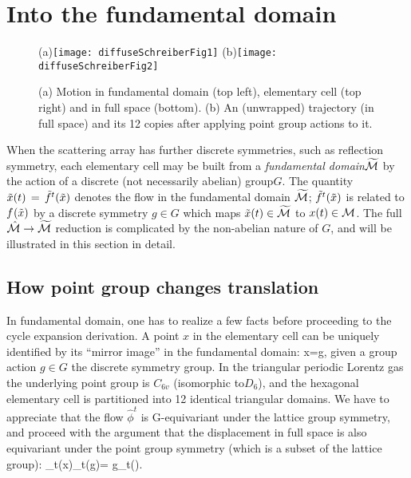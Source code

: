 \documentclass[aps,pre,
                showpacs,
                twocolumn,
                groupedaddress,
                floatfix]{revtex4-1}
\begin{document}
\section{Into the fundamental domain}
\label{s-SymmetryReduction}
\begin{figure}[htbp]
  \begin{center}
    (a)\texttt{[image: diffuseSchreiberFig1]}
    (b)\texttt{[image: diffuseSchreiberFig2]}
  \end{center}
  \caption[]{\label{fig-schrieberFig12} (a) Motion in fundamental domain (top   left), elementary cell (top right) and  in full space (bottom). (b) An (unwrapped) trajectory (in full  space) and its 12 copies after applying point group actions to it.   }
\end{figure}


When the scattering array has further discrete symmetries, such as reflection symmetry, each elementary cell may be built from a {\em fundamental domain}${\widetilde {{\cal M}}}$ by the action of a discrete (not necessarily abelian) group$G$. The quantity $\tilde x(t)\,=\,{\tilde{f}^{t}(\tilde x)}$ denotes the flow in the fundamental domain ${\widetilde {{\cal M}}}$; ${\tilde{f}^{t}(\tilde x)}$ is related to${f^{}(\tilde x)}$ by a discrete symmetry $g \in G$ which maps $\tilde x(t)\in{\widetilde {\ensuremath{{\cal M}}}}$ to ${x}(t) \in {\ensuremath{{\cal M}}}$. The full $\hat {{\cal M}} \rightarrow {\widetilde{\ensuremath{{\cal M}}}}$ reduction is complicated by the non-abelian nature of $G$, and will be illustrated in this section in detail.

\subsection{How point group changes translation}

In fundamental domain, one has to realize a few facts before proceeding to the cycle expansion derivation. A point $x$ in the elementary cell can be uniquely identified by its ``mirror image'' in the fundamental domain:
\beq
x=g\circ\tx,
\eeq
given a group action $g\in G$ the discrete symmetry group. In the triangular periodic Lorentz gas the underlying point group is $C_{6v}$ (isomorphic to$D_6$), and the hexagonal elementary cell is partitioned into 12 identical triangular domains. We have to appreciate that the flow $\hat{\phi}^t$ is G-equivariant under the lattice group symmetry, and proceed with the argument that the displacement in full space is also equivariant under the point group symmetry (which is a subset of the lattice group):
\beq
\hn_t(x)\equiv\hn_t(g\circ\tx)= g\circ\hn_t(\tx).
\eeq
\end{document}
